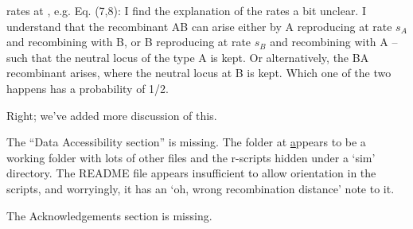 \begin{point}{rates at \revref, e.g. Eq. (7,8):}
 I find the explanation of the rates a bit unclear. I understand that the recombinant AB can arise either by A reproducing at rate $s_A$ and recombining with B, or B reproducing at rate $s_B$ and recombining with A -- such that the neutral locus of the type A is kept. Or alternatively, the BA recombinant arises, where the neutral locus at B is kept. Which one of the two happens has a probability of 1/2.
\end{point}

\reply
Right; we've added more discussion of this.

\begin{point}{}
The ``Data Accessibility section'' is missing. The folder at \href{http://github.com_petrelharp_clinal-lineages}  appears to be a working folder with lots of other files and the r-scripts hidden under a `sim' directory. The README file appears insufficient to allow orientation in the scripts, and worryingly, it has an `oh, wrong recombination distance' note to it.
\end{point}

\reply
{}

\begin{point}{}
The Acknowledgements section is missing.
\end{point}

\reply


% 
% 
% 
% 


% 
